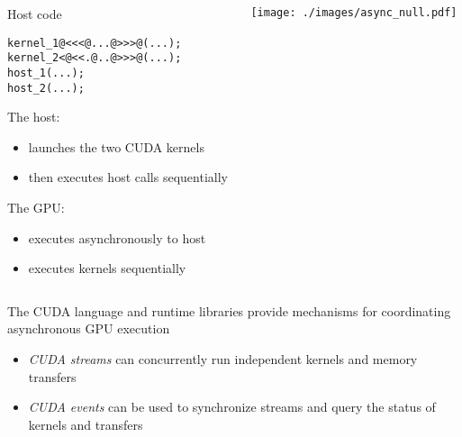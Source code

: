 \begin{frame}[fragile]{}
    \begin{columns}[T]
        \begin{column}{0.5\textwidth}
            \begin{codecolumn}{Host code}
                \begin{lstlisting}[style=boxcudatiny]
kernel_1@<<<@...@>>>@(...);
kernel_2<@<<.@..@>>>@(...);
host_1(...);
host_2(...);
                \end{lstlisting}
            \end{codecolumn}
                The host:
                \begin{itemize}
                    \item launches the two CUDA kernels
                    \item then executes host calls sequentially 
                \end{itemize}
                The GPU:
                \begin{itemize}
                    \item executes asynchronously to host
                    \item executes kernels sequentially
                \end{itemize}
        \end{column}
        \begin{column}{0.5\textwidth}
            \texttt{[image: ./images/async\_null.pdf]}
        \end{column}
    \end{columns}
\end{frame}

\begin{frame}[fragile]{}
    The CUDA language and runtime libraries provide mechanisms for coordinating asynchronous GPU execution

    \begin{itemize}
        \item \emph{CUDA streams} can concurrently run independent kernels and memory transfers
        \item \emph{CUDA events} can be used to synchronize streams and query the status of kernels and transfers
    \end{itemize}

\end{frame}

